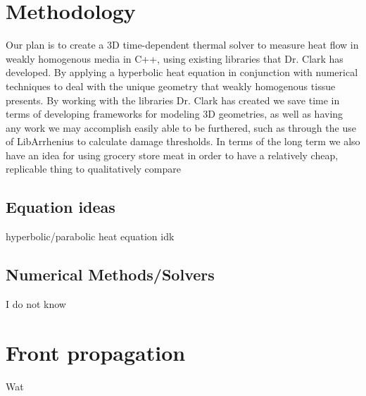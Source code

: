 \documentclass[12pt]{article}
\begin{document}
\section{Methodology}
Our plan is to create a 3D time-dependent thermal solver to measure heat flow in weakly homogenous media in C++, using existing libraries that Dr. Clark has developed. By applying a hyperbolic heat equation in conjunction with numerical techniques to deal with the unique geometry that weakly homogenous tissue presents. By working with the libraries Dr. Clark has created we save time in terms of developing frameworks for modeling 3D geometries, as well as having any work we may accomplish easily able to be furthered, such as through the use of LibArrhenius to calculate damage thresholds. In terms of the long term we also have an idea for using grocery store meat in order to have a relatively cheap, replicable thing to qualitatively compare

\subsection{Equation ideas}
hyperbolic/parabolic heat equation
idk
\subsection{Numerical Methods/Solvers}
I do not know
\section{Front propagation}
Wat
\end{document}
